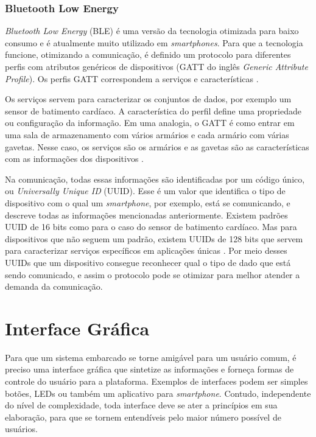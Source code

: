 \subsubsection{Bluetooth Low Energy}

\textit{Bluetooth Low Energy} (BLE) é uma versão da tecnologia otimizada para baixo consumo e é atualmente muito utilizado em \textit{smartphones}. Para que a tecnologia funcione, otimizando a comunicação, é definido um protocolo para diferentes perfis com atributos genéricos de dispositivos (GATT do inglês \textit{Generic Attribute Profile}). Os perfis GATT correspondem a serviços e características \cite{man:btlecore52}.

Os serviços servem para caracterizar os conjuntos de dados, por exemplo um sensor de batimento cardíaco. A característica do perfil define uma propriedade ou configuração da informação. Em uma analogia, o GATT é como entrar em uma sala de armazenamento com vários armários e cada armário com várias gavetas. Nesse caso, os serviços são os armários e as gavetas são as características com as informações dos dispositivos \cite{site:devzonebtle}.

Na comunicação, todas essas informações são identificadas por um código único, ou \textit{Universally Unique ID} (UUID). Esse é um valor que identifica o tipo de dispositivo com o qual um \textit{smartphone}, por exemplo, está se comunicando, e descreve todas as informações mencionadas anteriormente. Existem padrões UUID de 16 bits como para o caso do sensor de batimento cardíaco. Mas para dispositivos que não seguem um padrão, existem UUIDs de 128 bits que servem para caracterizar serviços específicos em aplicações únicas \cite{site:devzonebtle}. Por meio desses UUIDs que um dispositivo consegue reconhecer qual o tipo de dado que está sendo comunicado, e assim o protocolo pode se otimizar para melhor atender a demanda da comunicação.

\section{Interface Gráfica}
Para que um sistema embarcado se torne amigável para um usuário comum, é preciso uma interface gráfica que sintetize as informações e forneça formas de controle do usuário para a plataforma. Exemplos de interfaces podem ser simples botões, LEDs ou também um aplicativo para \textit{smartphone}. Contudo, independente do nível de complexidade, toda interface deve se ater a princípios em sua elaboração, para que se tornem entendíveis pelo maior número possível de usuários.

